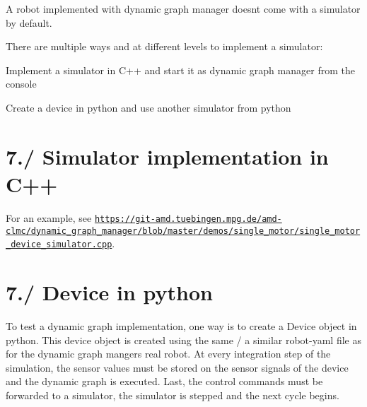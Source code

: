 A robot implemented with dynamic graph manager doesn\textquotesingle{}t come with a simulator by default.

There are multiple ways and at different levels to implement a simulator\+:
\begin{DoxyItemize}
\item Implement a simulator in C++ and start it as dynamic graph manager from the console
\item Create a device in python and use another simulator from python
\end{DoxyItemize}\hypertarget{subpage_robot_simulation_simu_sec_cpp}{}\section{7./ Simulator implementation in C++}\label{subpage_robot_simulation_simu_sec_cpp}
For an example, see \href{https://git-amd.tuebingen.mpg.de/amd-clmc/dynamic_graph_manager/blob/master/demos/single_motor/single_motor_device_simulator.cpp}{\tt https\+://git-\/amd.\+tuebingen.\+mpg.\+de/amd-\/clmc/dynamic\+\_\+graph\+\_\+manager/blob/master/demos/single\+\_\+motor/single\+\_\+motor\+\_\+device\+\_\+simulator.\+cpp}.\hypertarget{subpage_robot_simulation_simu_sec_python}{}\section{7./ Device in python}\label{subpage_robot_simulation_simu_sec_python}
To test a dynamic graph implementation, one way is to create a Device object in python. This device object is created using the same / a similar robot-\/yaml file as for the dynamic graph manger\textquotesingle{}s real robot. At every integration step of the simulation, the sensor values must be stored on the sensor signals of the device and the dynamic graph is executed. Last, the control commands must be forwarded to a simulator, the simulator is stepped and the next cycle begins.

